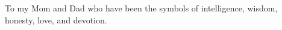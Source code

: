 \vspace*{7cm}
\begin{center}
To my Mom and Dad who have been the symbols of intelligence, wisdom, honesty, love, and devotion.  
\end{center}
